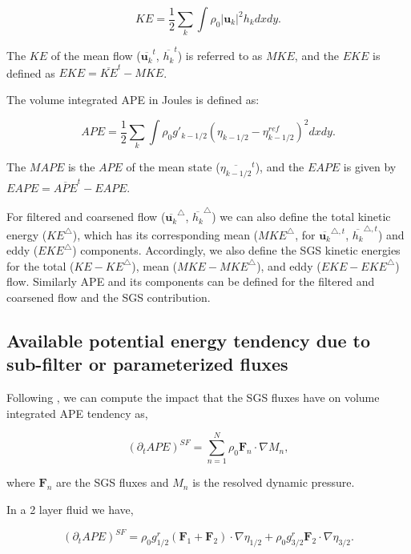 \documentclass[draft,ms]{agutexSI2019}
\begin{document}
\begin{article}
\begin{equation}
    KE = \frac{1}{2} \sum_k \int \rho_0 |\mathbf{u}_k|^2 h_k dx dy.
\end{equation}
 
The $KE$ of the mean flow ($\overline{\mathbf{u}_k}^t$, $\overline{h_k}^t$) is referred to as $MKE$, and the $EKE$ is defined as $EKE = \overline{KE}^t - MKE$. 

The volume integrated APE in Joules is defined as: 
 
\begin{equation}
    APE = \frac{1}{2} \sum_k \int \rho_0   g'_{k-1/2} (\eta_{k-1/2} - \eta^{ref}_{k-1/2})^2 dxdy.
\end{equation}
 

The $MAPE$ is the $APE$ of the mean state ($\overline{\eta_{k-1/2}}^t$), and the $EAPE$ is given by $EAPE = \overline{APE}^t - EAPE$.

For filtered and coarsened flow ($\overline{\mathbf{u}_k}^{\triangle}$, $\overline{h_k}^{\triangle}$) we can also define the total kinetic energy ($KE^\triangle$), which has its corresponding mean ($MKE^\triangle$, for $\overline{\mathbf{u}_k}^{\triangle, t}$, $\overline{h_k}^{\triangle,t}$) and eddy ($EKE^\triangle$) components. Accordingly, we also define the SGS kinetic energies for the total ($KE- KE^\triangle$), mean ($MKE- MKE^\triangle$), and eddy ($EKE- EKE^\triangle$) flow. Similarly APE and its components can be defined for the filtered and coarsened flow and the SGS contribution.


\subsection{Available potential energy tendency due to sub-filter or parameterized fluxes}
\label{app:online_metrics/APE_tend}
Following , we can compute the impact that the SGS fluxes have on volume integrated APE tendency as, 
 
\begin{equation}
    (\partial_t APE)^{SF} = \sum_{n=1}^{N} \rho_0 \mathbf{F}_n \cdot \nabla M_n,
\end{equation}
 
where $\mathbf{F}_n$ are the SGS fluxes and $M_n$ is the resolved dynamic pressure. 

In a 2 layer fluid we  have, 
 
\begin{equation}
    (\partial_t APE)^{SF} = \rho_0 g^r_{1/2} (\mathbf{F}_1 + \mathbf{F}_2) \cdot \nabla \eta_{1/2} +  \rho_0 g^r_{3/2} \mathbf{F}_2 \cdot \nabla \eta_{3/2}.
\end{equation}
 

\end{article}
\end{document}
